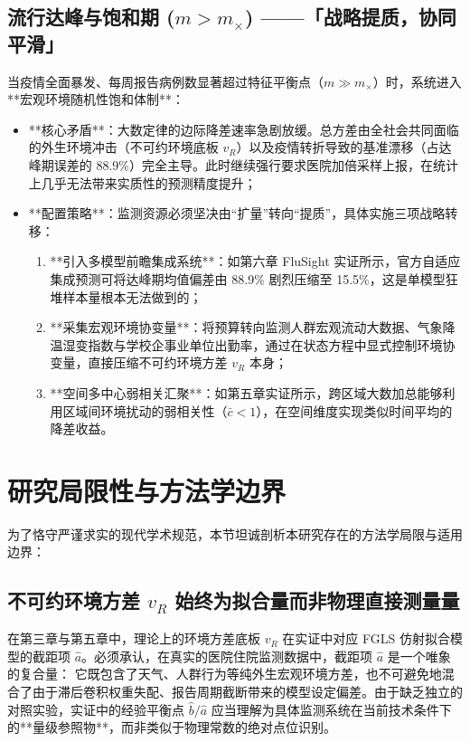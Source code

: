\subsection{流行达峰与饱和期 ($m > m_\times$) ——「战略提质，协同平滑」}
当疫情全面暴发、每周报告病例数显著超过特征平衡点（$m \gg m_\times$）时，系统进入**宏观环境随机性饱和体制**：
\begin{itemize}
    \item **核心矛盾**：大数定律的边际降差速率急剧放缓。总方差由全社会共同面临的外生环境冲击（不可约环境底板 $v_R$）以及疫情转折导致的基准漂移（占达峰期误差的 88.9\%）完全主导。此时继续强行要求医院加倍采样上报，在统计上几乎无法带来实质性的预测精度提升；
    \item **配置策略**：监测资源必须坚决由“扩量”转向“提质”，具体实施三项战略转移：
    \begin{enumerate}[label=(\arabic*)]
        \item **引入多模型前瞻集成系统**：如第六章 FluSight 实证所示，官方自适应集成预测可将达峰期均值偏差由 88.9\% 剧烈压缩至 15.5\%，这是单模型狂堆样本量根本无法做到的；
        \item **采集宏观环境协变量**：将预算转向监测人群宏观流动大数据、气象降温湿变指数与学校企事业单位出勤率，通过在状态方程中显式控制环境协变量，直接压缩不可约环境方差 $v_R$ 本身；
        \item **空间多中心弱相关汇聚**：如第五章实证所示，跨区域大数加总能够利用区域间环境扰动的弱相关性（$\bar{c} < 1$），在空间维度实现类似时间平均的降差收益。
    \end{enumerate}
\end{itemize}

\section{研究局限性与方法学边界}\label{sec:limitations}

为了恪守严谨求实的现代学术规范，本节坦诚剖析本研究存在的方法学局限与适用边界：

\subsection{不可约环境方差 $v_R$ 始终为拟合量而非物理直接测量量}
在第三章与第五章中，理论上的环境方差底板 $v_R$ 在实证中对应 FGLS 仿射拟合模型的截距项 $\hat{a}$。必须承认，在真实的医院住院监测数据中，截距项 $\hat{a}$ 是一个唯象的复合量：
它既包含了天气、人群行为等纯外生宏观环境方差，也不可避免地混合了由于滞后卷积权重失配、报告周期截断带来的模型设定偏差。由于缺乏独立的对照实验，实证中的经验平衡点 $\hat{b}/\hat{a}$ 应当理解为具体监测系统在当前技术条件下的**量级参照物**，而非类似于物理常数的绝对点位识别。

